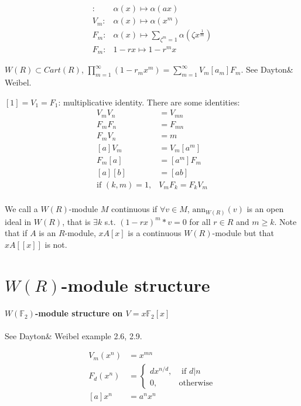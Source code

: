 \begin{align*}
[a]\colon & \alpha(x) \mapsto \alpha(ax)\\
V_m\colon & \alpha(x) \mapsto \alpha(x^m)\\
F_m\colon & \alpha(x) \mapsto \sum_{\zeta^m=1} \alpha(\zeta x^{\frac{1}{m}})\\
F_m\colon & 1-rx \mapsto 1-r^mx
\end{align*}




\begin{remark}
	$W(R)\subset Cart(R)$, $\prod_{m=1}^\infty(1-r_mx^m)=\sum_{m=1}^\infty V_m[a_m]F_m$. See Dayton\& Weibel.
\end{remark}
\begin{prop}
	$[1]=V_1=F_1$: multiplicative identity. There are some identities:
	\begin{align*}
	 V_mV_n&=V_{mn}\\
	 F_mF_n&=F_{mn}\\
	 F_mV_n&=m\\
	 [a]V_m&=V_{m}[a^m]\\
	 F_m[a]&=[a^m] F_m\\
	 [a][b]&=[ab]\\
	 \mbox{if } (k,m)=1,& V_mF_k=F_kV_m\\
	\end{align*}
	
\end{prop}

We call a $W(R)$-module $M$ continuous if $\forall v \in M$, $\textrm{ann}_{W(R)}(v)$ is an open ideal in $W(R)$, that is $\exists k$ s.t. $(1-rx)^m *v =0$ for all $r\in R$ and $m\geqslant k$. Note that if $A$ is an $R$-module, $xA[x]$ is a continuous $W(R)$-module but that $xA[[x]]$ is not.

\section{$W(R)$-module structure} %
\label{sec:module_structure}

\paragraph{$W(\mathbb{F}_2)$-module structure on $V=x \mathbb{F}_2[x]$} See Dayton\& Weibel example 2.6, 2.9.

\begin{align*}
 V_m(x^n)&=x^{mn}\\
 F_d(x^n)&=\begin{cases}
 	dx^{n/d},& \mbox{ if $d|n$}\\
 	0,& \mbox{otherwise}
 \end{cases}\\
 [a]x^n&=a^nx^n
 \end{align*}
